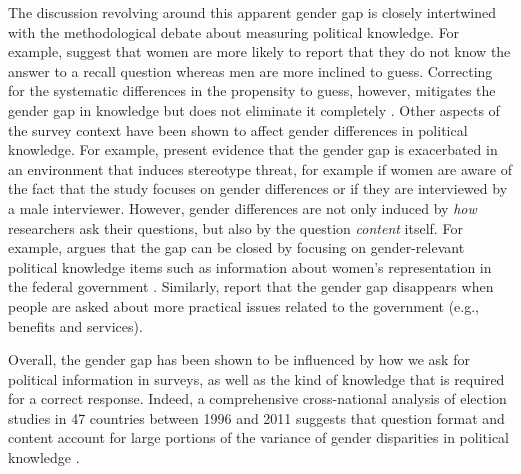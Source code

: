 The discussion revolving around this apparent gender gap is closely intertwined with the methodological debate about measuring political knowledge. For example, \citet{mondak2004knowledge} suggest that women are more likely to report that they do not know the answer to a recall question whereas men are more inclined to guess. Correcting for the systematic differences in the propensity to guess, however, mitigates the gender gap in knowledge but does not eliminate it completely \citep[see also][]{lizotte2009explaining}. Other aspects of the survey context have been shown to affect gender differences in political knowledge. For example, \citet{mcglone2006stereotype} present evidence that the gender gap is exacerbated in an environment that induces stereotype threat, for example if women are aware of the fact that the study focuses on gender differences or if they are interviewed by a male interviewer. However, gender differences are not only induced by \textit{how} researchers ask their questions, but also by the question \textit{content} itself. For example, \citet{dolan2011women} argues that the gap can be closed by focusing on gender-relevant political knowledge items such as information about women's representation in the federal government \citep[see also][]{graber2001processing,fraile2014does,jerit2017revisiting}. Similarly, \citet{stolle2010women} report that the gender gap disappears when people are asked about more practical issues related to the government (e.g., benefits and services).

Overall, the gender gap has been shown to be influenced by how we ask for political information in surveys, as well as the kind of knowledge that is required for a correct response. Indeed, a comprehensive cross-national analysis of election studies in 47 countries between 1996 and 2011 suggests that question format and content account for large portions of the variance of gender disparities in political knowledge \citep{fortin2016cross}.


